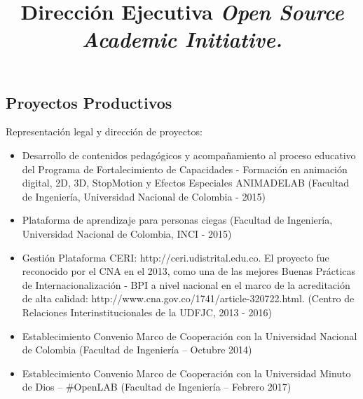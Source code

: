 \documentclass[overlapped,line,final,letterpaper]{res}
\begin{document}
\begin{resume}
\vspace{0.5cm}
\section{\sc Proyectos Productivos } %
\vspace{0.5cm}
\title{\bf Dirección Ejecutiva
	\newline \em Open Source Academic Initiative.
}
\begin{position}
Representación legal y dirección de proyectos:
\begin{itemize}
\item Desarrollo de contenidos pedagógicos y acompañamiento al proceso educativo del Programa de Fortalecimiento de Capacidades - Formación en animación digital, 2D, 3D, StopMotion y Efectos Especiales ANIMADELAB (Facultad de Ingeniería, Universidad Nacional de Colombia - 2015)
\item Plataforma de aprendizaje para personas ciegas (Facultad de Ingeniería, Universidad Nacional de Colombia, INCI - 2015)
\item Gestión Plataforma CERI: http://ceri.udistrital.edu.co. El proyecto fue reconocido por el CNA en el 2013, como una de las mejores Buenas Prácticas de Internacionalización - BPI a nivel nacional en el marco de la acreditación de alta calidad: http://www.cna.gov.co/1741/article-320722.html. (Centro de Relaciones Interinstitucionales de la UDFJC,  2013 - 2016)
\item Establecimiento Convenio Marco de Cooperación con la Universidad Nacional de Colombia (Facultad de Ingeniería – Octubre 2014)
\item Establecimiento Convenio Marco de Cooperación con la Universidad Minuto de Dios – \#OpenLAB (Facultad de Ingeniería – Febrero 2017)
\end{itemize}

\end{position}



\end{resume}
\end{document}
